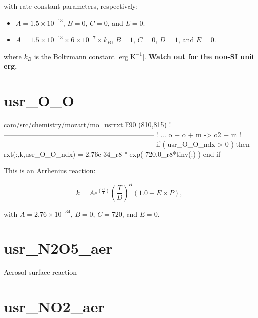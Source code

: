 \documentclass[titlepage]{article}
\begin{document}
\noindent with rate constant parameters, respectively:

\begin{itemize}
\item $A = 1.5 \times 10^{-13}$, $B = 0$, $C = 0$, and $E = 0$.
\item $A = 1.5 \times 10^{-13} \times 6 \times 10^{-7} \times k_B$, $B = 1$, $C = 0$, $D = 1$, and $E = 0$.
\end{itemize}

\noindent where $k_B$ is the Boltzmann constant [erg $\mbox{K}^{-1}$]. \textbf{Watch out for the non-SI unit erg.}



\section{usr\_O\_O}

\begin{blockcode}[commandchars=\\\{\}]
\color{gray}cam/src/chemistry/mozart/mo_usrrxt.F90 (810,815)
!-----------------------------------------------------------------
! ... o + o + m -> o2 + m
!-----------------------------------------------------------------
       if ( usr_O_O_ndx > 0 ) then
          rxt(:,k,usr_O_O_ndx) = 2.76e-34_r8 * exp( 720.0_r8*tinv(:) )
       end if
\end{blockcode}

This is an Arrhenius reaction:

\begin{equation}
k = Ae^{(\frac{C}{T})}(\frac{T}{D})^B(1.0+E \times P),
\end{equation}

\noindent with $A = 2.76 \times 10^{-34}$, $B = 0$, $C = 720$, and $E = 0$.
 
 
          
\section{usr\_N2O5\_aer}

Aerosol surface reaction


\section{usr\_NO2\_aer}
\end{document}
